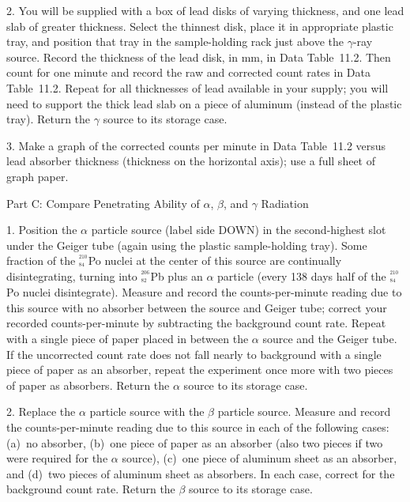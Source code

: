 \item{2.} You will be supplied with a box of lead disks
of varying thickness, and one lead slab of greater thickness.  
Select the thinnest disk, place it in appropriate plastic
tray, and position that tray in the sample-holding rack just 
above the $\gamma$-ray source.  Record the thickness of the 
lead disk, in mm, in Data Table~11.2.  Then count for one 
minute and record the raw and corrected count rates in 
Data Table~11.2.  Repeat for all thicknesses of lead 
available in your supply; you will need to support the thick
lead slab on a piece of aluminum (instead of the plastic tray).
Return the $\gamma$ source to its storage case.

\item{3.} Make a graph of the corrected counts per minute
in Data Table~11.2 versus lead absorber thickness (thickness 
on the horizontal axis); use a full sheet of graph paper. 
\bigskip
\centerline{Part C: Compare Penetrating Ability of
$\alpha$, $\beta$, and $\gamma$ Radiation}
\smallskip
\item{1.} Position the $\alpha$ particle source (label side 
DOWN) in the second-highest slot under the Geiger tube (again 
using the plastic sample-holding tray).  Some fraction of the 
$^{^{210}}_{^{84}}$Po nuclei at the center of this source are 
continually disintegrating, turning into $^{^{206}}_{^{82}}$Pb
plus an $\alpha$ particle (every 138 days half of the 
$^{^{210}}_{^{84}}$Po nuclei disintegrate).  Measure and
record the counts-per-minute reading due to this source with
no absorber between the source and Geiger tube; correct your
recorded counts-per-minute by subtracting the background 
count rate.  Repeat with a single piece of paper placed
in between the $\alpha$ source and the Geiger tube.  If the
uncorrected count rate does not fall nearly to background 
with a single piece of paper as an absorber, repeat the 
experiment once more with two pieces of paper as absorbers.
Return the $\alpha$ source to its storage case.

\item{2.} Replace the $\alpha$ particle source with the $\beta$
particle source.  Measure and record the counts-per-minute
reading due to this source in each of the following cases:
(a)~no absorber, (b)~one piece of paper as an absorber (also
two pieces if two were required for the $\alpha$ source), 
(c)~one piece of aluminum sheet as an absorber, and (d)~two
pieces of aluminum sheet as absorbers.  In each case, correct
for the background count rate.  Return the $\beta$ source
to its storage case.

